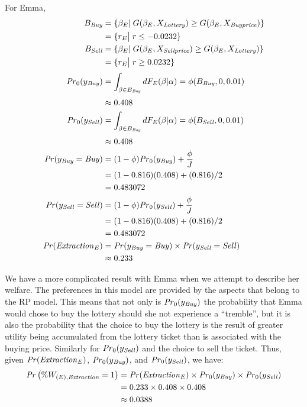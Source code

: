 \documentclass[../main.tex]{subfiles}
\begin{document}
\noindent For Emma,
\begin{align}
	\label{eq2:Emma}
	\begin{split}
		B_{\mathit{Buy}} &= \{ \beta_E |\; G(\beta_E,X_{\mathit{Lottery}}) \geq G(\beta_E,X_{\mathit{Buy price}})\}\\
		&= \{ r_E \big|\; r \leq -0.0232 \} \\
		B_{\mathit{Sell}} &= \{ \beta_E |\; G(\beta_E,X_{\mathit{Sell price}}) \geq G(\beta_E,X_{\mathit{Lottery}})\}\\
		&= \{ r_E \big|\; r \geq 0.0232 \} \\[0.5ex]
		{\ensuremath{\mathit{Pr}}}_0(y_{\mathit{Buy}}) &= \int_{\beta \in B_{\mathit{Buy}}} dF_E(\beta|\alpha) = \phi(B_{\mathit{Buy}},0,0.01)\\[0.5ex]
		&\approx 0.408 \\
		{\mathit{Pr}}_0(y_{\mathit{Sell}}) &= \int_{\beta \in B_{\mathit{Buy}}} dF_E(\beta|\alpha) = \phi(B_{\mathit{Sell}},0,0.01)\\[0.5ex]
		&\approx 0.408 \\
		{\mathit{Pr}}(y_{\mathit{Buy}}=\mathit{Buy}) &= (1-\phi) {\mathit{Pr}}_0(y_{\mathit{Buy}}) + \frac{\phi}{J}\\
		&=(1-0.816)(0.408) + (0.816)/2\\
		&= 0.483072\\
		{\mathit{Pr}}(y_{\mathit{Sell}}=\mathit{Sell}) &= (1-\phi) {\mathit{Pr}}_0(y_{\mathit{Sell}}) + \frac{\phi}{J}\\
		&=(1-0.816)(0.408) + (0.816)/2\\
		&= 0.483072\\
		{\mathit{Pr}}(\mathit{Extraction}_E) &= {\mathit{Pr}}(y_{\mathit{Buy}} = \mathit{Buy}) \times {\ensuremath{\mathit{Pr}}}(y_{\mathit{Sell}} = \mathit{Sell})\\
		&\approx 0.233
	\end{split}
\end{align}

We have a more complicated result with Emma when we attempt to describe her welfare.
The preferences in this model are provided by the aspects that belong to the RP model.
This means that not only is ${\mathit{Pr}}_0(y_{\mathit{Buy}})$ the probability that Emma would chose to buy the lottery should she not experience a \enquote{tremble}, but it is also the probability that the choice to buy the lottery is the result of greater utility being accumulated from the lottery ticket than is associated with the buying price.
Similarly for ${\mathit{Pr}}_0(y_{\mathit{Sell}})$ and the choice to sell the ticket.
Thus, given ${\mathit{Pr}}(\mathit{Extraction}_E)$, ${\mathit{Pr}}_0(y_{\mathit{Buy}})$, and ${\mathit{Pr}}_0(y_{\mathit{Sell}})$, we have:
\begin{align}
	\begin{split}
		{\ensuremath{\mathit{Pr}}}\left(\% W_{(E),\mathit{Extraction}} = 1\right) &= {\mathit{Pr}}(\mathit{Extraction}_E) \times {\ensuremath{\mathit{Pr}}}_0(y_{\mathit{Buy}}) \times {\ensuremath{\mathit{Pr}}}_0(y_{\mathit{Sell}})\\
		&= 0.233 \times 0.408 \times 0.408\\
		&\approx 0.0388
	\end{split}
\end{align}
\end{document}
